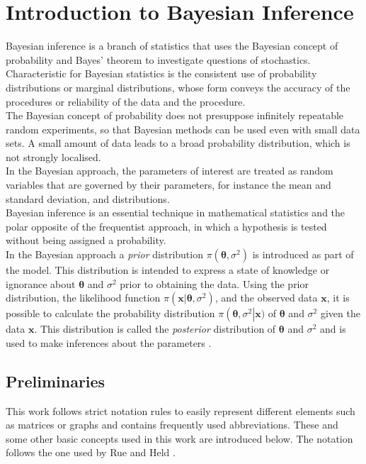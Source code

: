%
\chapter{Introduction to Bayesian Inference}
\label{sec:bayes}
Bayesian inference is a branch of statistics that uses the Bayesian concept of probability and Bayes' theorem to investigate questions of stochastics. \\
Characteristic for Bayesian statistics is the consistent use of probability distributions or marginal distributions, whose form conveys the accuracy of the procedures or reliability of the data and the procedure. \\
The Bayesian concept of probability does not presuppose infinitely repeatable random experiments, so that Bayesian methods can be used even with small data sets. A small amount of data leads to a broad probability distribution, which is not strongly localised. \\ 
In the Bayesian approach, the parameters of interest are treated as random variables that are governed by their parameters, for instance the mean and standard deviation, and distributions. \\
Bayesian inference is an essential technique in mathematical statistics and the polar opposite of the frequentist approach, in which a hypothesis is tested without being assigned a probability. \\
In the Bayesian approach a \textit{prior} distribution $\pi\left(\pmb{\theta}, \sigma^2\right)$ is introduced as part of the model. This distribution is intended to express a state of knowledge or ignorance about $\pmb{\theta}$ and $\sigma^2$ prior to obtaining the data. Using the prior distribution, the likelihood function $\pi\left(\pmb{x}|\pmb{\theta},\sigma^2\right)$, and the observed data $\pmb{x}$, it is possible to calculate the probability distribution $\pi\left(\pmb{\theta},\sigma^2\right|\pmb{x})$ of $\pmb{\theta}$ and $\sigma^2$ given the data $\pmb{x}$. This distribution is called the \textit{posterior} distribution of $\pmb{\theta}$ and $\sigma^2$ and is used to make inferences about the parameters \autocite[][6]{box2011bayesian}.
\clearpage
\section{Preliminaries}
This work follows strict notation rules to easily represent different elements such as matrices or graphs and contains frequently used abbreviations. These and some other basic concepts used in this work are introduced below. The notation follows the one used by Rue and Held \autocite[][14--19]{rue2005gaussian}.
